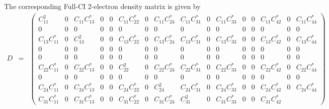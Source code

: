 \documentclass[pra,nofootinbib]{revtex4-1}
\newcommand{\Ctwo}[2]{C_{{#1}{#2}}}
\begin{document}
The corresponding Full-CI 2-electron density matrix is given by
\setcounter{MaxMatrixCols}{20}
\tiny
\begin{eqnarray}
   D &=&
   \begin{pmatrix}
    \Ctwo{1}{1}^2 &
    0 &
    \Ctwo{1}{1}\Ctwo{1}{3}^{*} &
    0 &
    0 &
    \Ctwo{1}{1}\Ctwo{2}{2}^{*} &
    0 &
    \Ctwo{1}{1}\Ctwo{2}{4}^{*} &
    \Ctwo{1}{1}\Ctwo{3}{1}^{*} &
    0 &
    \Ctwo{1}{1}\Ctwo{3}{3}^{*} &
    0 &
    0 &
    \Ctwo{1}{1}\Ctwo{4}{2}^{*} &
    0 &
    \Ctwo{1}{1}\Ctwo{4}{4}^{*} \\
    0 &
    0 &
    0 &
    0 &
    0 &
    0 &
    0 &
    0 &
    0 &
    0 &
    0 &
    0 &
    0 &
    0 &
    0 &
    0 \\
    \Ctwo{1}{3}\Ctwo{1}{1}^{*} &
    0 &
    \Ctwo{1}{3}^2 &
    0 &
    0 &
    \Ctwo{1}{3}\Ctwo{2}{2}^{*} &
    0 &
    \Ctwo{1}{3}\Ctwo{2}{4}^{*} &
    \Ctwo{1}{3}\Ctwo{3}{1}^{*} &
    0 &
    \Ctwo{1}{3}\Ctwo{3}{3}^{*} &
    0 &
    0 &
    \Ctwo{1}{3}\Ctwo{4}{2}^{*} &
    0 &
    \Ctwo{1}{3}\Ctwo{4}{4}^{*} \\
    0 &
    0 &
    0 &
    0 &
    0 &
    0 &
    0 &
    0 &
    0 &
    0 &
    0 &
    0 &
    0 &
    0 &
    0 &
    0 \\
    0 &
    0 &
    0 &
    0 &
    0 &
    0 &
    0 &
    0 &
    0 &
    0 &
    0 &
    0 &
    0 &
    0 &
    0 &
    0 \\
    \Ctwo{2}{2}\Ctwo{1}{1}^{*} &
    0 &
    \Ctwo{2}{2}\Ctwo{1}{3}^{*} &
    0 &
    0 &
    \Ctwo{2}{2}^2 &
    0 &
    \Ctwo{2}{2}\Ctwo{2}{4}^{*} &
    \Ctwo{2}{2}\Ctwo{3}{1}^{*} &
    0 &
    \Ctwo{2}{2}\Ctwo{3}{3}^{*} &
    0 &
    0 &
    \Ctwo{2}{2}\Ctwo{4}{2}^{*} &
    0 &
    \Ctwo{2}{2}\Ctwo{4}{4}^{*} \\
    0 &
    0 &
    0 &
    0 &
    0 &
    0 &
    0 &
    0 &
    0 &
    0 &
    0 &
    0 &
    0 &
    0 &
    0 &
    0 \\
    \Ctwo{2}{4}\Ctwo{1}{1}^{*} &
    0 &
    \Ctwo{2}{4}\Ctwo{1}{3}^{*} &
    0 &
    0 &
    \Ctwo{2}{4}\Ctwo{2}{2}^{*} &
    0 &
    \Ctwo{2}{4}^2 &
    \Ctwo{2}{4}\Ctwo{3}{1}^{*} &
    0 &
    \Ctwo{2}{4}\Ctwo{3}{3}^{*} &
    0 &
    0 &
    \Ctwo{2}{4}\Ctwo{4}{2}^{*} &
    0 &
    \Ctwo{2}{4}\Ctwo{4}{4}^{*} \\
    \Ctwo{3}{1}\Ctwo{1}{1}^{*} &
    0 &
    \Ctwo{3}{1}\Ctwo{1}{3}^{*} &
    0 &
    0 &
    \Ctwo{3}{1}\Ctwo{2}{2}^{*} &
    0 &
    \Ctwo{3}{1}\Ctwo{2}{4}^{*} &
    \Ctwo{3}{1}^2 &
    0 &
    \Ctwo{3}{1}\Ctwo{3}{3}^{*} &
    0 &
    0 &
    \Ctwo{3}{1}\Ctwo{4}{2}^{*} &

\end{pmatrix}
\end{eqnarray}
\end{document}
